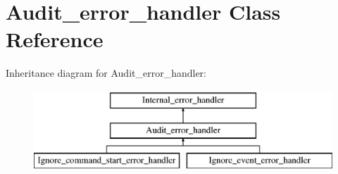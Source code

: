 \hypertarget{classAudit__error__handler}{}\section{Audit\+\_\+error\+\_\+handler Class Reference}
\label{classAudit__error__handler}
Inheritance diagram for Audit\+\_\+error\+\_\+handler\+:\begin{figure}[H]
\begin{center}
\leavevmode
\includegraphics[height=3.000000cm]{classAudit__error__handler}
\end{center}
\end{figure}
